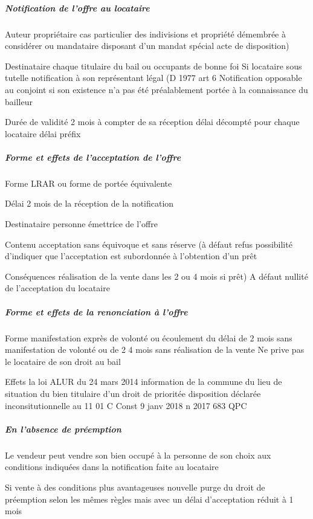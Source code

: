 \documentclass[10pt,a4paper,twoside]{article}
\begin{document}
				\subparagraph{Notification de l’offre au locataire}

					Auteur propriétaire cas particulier des indivisions et propriété
					démembrée à considérer ou mandataire disposant d’un mandat
					spécial acte de disposition)

					Destinataire chaque titulaire du bail ou occupants de bonne foi Si
					locataire sous tutelle notification à son représentant légal (D
					1977 art 6 Notification opposable au conjoint si son existence n’a
					pas été préalablement portée à la connaissance du bailleur

					Durée de validité 2 mois à compter de sa réception délai
					décompté pour chaque locataire délai préfix

				\subparagraph{Forme et effets de l’acceptation de l’offre}

					Forme LRAR ou forme de portée équivalente

					Délai 2 mois de la réception de la notification

					Destinataire personne émettrice de l’offre

					Contenu acceptation sans équivoque et sans réserve (à défaut
					refus possibilité d’indiquer que l’acceptation est subordonnée à
					l’obtention d’un prêt

					Conséquences réalisation de la vente dans les 2 ou 4 mois si prêt) A
					défaut nullité de l’acceptation du locataire

				\subparagraph{Forme et effets de la renonciation à l’offre}

					Forme manifestation exprès de volonté ou écoulement du
					délai de 2 mois sans manifestation de volonté ou de 2 4
					mois sans réalisation de la vente Ne prive pas le locataire
					de son droit au bail

					Effets la loi ALUR du 24 mars 2014 information de la
					commune du lieu de situation du bien titulaire d’un droit de
					prioritée disposition déclarée inconsitutionnelle au
					11 01 C Const 9 janv 2018 n 2017 683 QPC

				\subparagraph{En l’absence de préemption}

					Le vendeur peut vendre son bien occupé à la personne de
					son choix aux conditions indiquées dans la notification
					faite au locataire

					Si vente à des conditions plus avantageuses nouvelle
					purge du droit de préemption selon les mêmes règles mais
					avec un délai d’acceptation réduit à 1 mois
\end{document}
